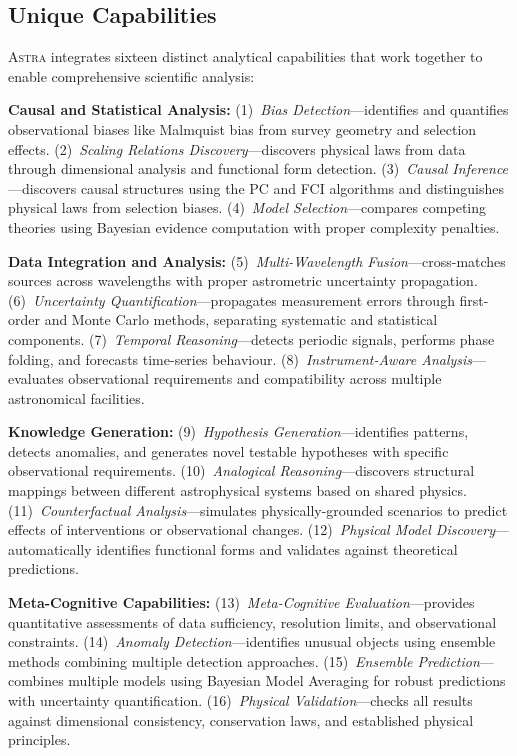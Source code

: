\documentclass[fleqn,usenatbib]{mnras}
\newcommand{\astra}{\textsc{Astra}\xspace}
\newcommand{\pc}{PC\xspace}
\newcommand{\fci}{FCI\xspace}
\begin{document}
\subsection{Unique Capabilities}
\label{sec:methods:capabilities}

\astra integrates sixteen distinct analytical capabilities that work together to enable comprehensive scientific analysis:

\textbf{Causal and Statistical Analysis:}
(1)~\emph{Bias Detection}---identifies and quantifies observational biases like Malmquist bias from survey geometry and selection effects.
(2)~\emph{Scaling Relations Discovery}---discovers physical laws from data through dimensional analysis and functional form detection.
(3)~\emph{Causal Inference}---discovers causal structures using the \pc and \fci algorithms \citep{Spirtes2000,Zhang2008} and distinguishes physical laws from selection biases.
(4)~\emph{Model Selection}---compares competing theories using Bayesian evidence computation with proper complexity penalties.

\textbf{Data Integration and Analysis:}
(5)~\emph{Multi-Wavelength Fusion}---cross-matches sources across wavelengths with proper astrometric uncertainty propagation.
(6)~\emph{Uncertainty Quantification}---propagates measurement errors through first-order and Monte Carlo methods, separating systematic and statistical components.
(7)~\emph{Temporal Reasoning}---detects periodic signals, performs phase folding, and forecasts time-series behaviour.
(8)~\emph{Instrument-Aware Analysis}---evaluates observational requirements and compatibility across multiple astronomical facilities.

\textbf{Knowledge Generation:}
(9)~\emph{Hypothesis Generation}---identifies patterns, detects anomalies, and generates novel testable hypotheses with specific observational requirements.
(10)~\emph{Analogical Reasoning}---discovers structural mappings between different astrophysical systems based on shared physics.
(11)~\emph{Counterfactual Analysis}---simulates physically-grounded scenarios to predict effects of interventions or observational changes.
(12)~\emph{Physical Model Discovery}---automatically identifies functional forms and validates against theoretical predictions.

\textbf{Meta-Cognitive Capabilities:}
(13)~\emph{Meta-Cognitive Evaluation}---provides quantitative assessments of data sufficiency, resolution limits, and observational constraints.
(14)~\emph{Anomaly Detection}---identifies unusual objects using ensemble methods combining multiple detection approaches.
(15)~\emph{Ensemble Prediction}---combines multiple models using Bayesian Model Averaging for robust predictions with uncertainty quantification.
(16)~\emph{Physical Validation}---checks all results against dimensional consistency, conservation laws, and established physical principles.
\end{document}
